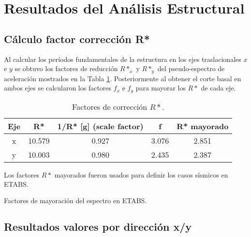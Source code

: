 \newpage
\section{Resultados del Análisis Estructural}

\subsection{Cálculo factor corrección R*}

Al calcular los períodos fundamentales de la estructura en los ejes traslacionales $x$ e $y$ se obtuvo los factores de reducción $R*_x$ y $R*_y$ del pseudo-espectro de aceleración mostrados en la Tabla \ref{tab:factores-reduccion-r}. Posteriormente al obtener el corte basal en ambos ejes se calcularon los factores $f_x$ e $f_y$ para mayorar los $R*$ de cada eje.

\begin{table}[H]
  \centering
  \caption{Factores de corrección $R*$.}
  \begin{tabular}{ccccc}
    \hline
    \textbf{Eje} & \textbf{R*} & \textbf{1/R* [g] (scale factor)} & \textbf{f} & \textbf{R* mayorado} \bigstrut\\
    \hline
    x     & 10.579 & 0.927 & 3.076 & 2.851 \bigstrut[t]\\
    y     & 10.003 & 0.980 & 2.435 & 2.387 \bigstrut[b]\\
    \hline
  \end{tabular}
  \label{tab:factores-reduccion-r}
\end{table}

Los factores $R*$ mayorados fueron usados para definir los casos sísmicos en ETABS.

\begin{images}{Factores de mayoración del espectro en ETABS.}
\end{images}

\newpage
\subsection{Resultados valores por dirección x/y}

